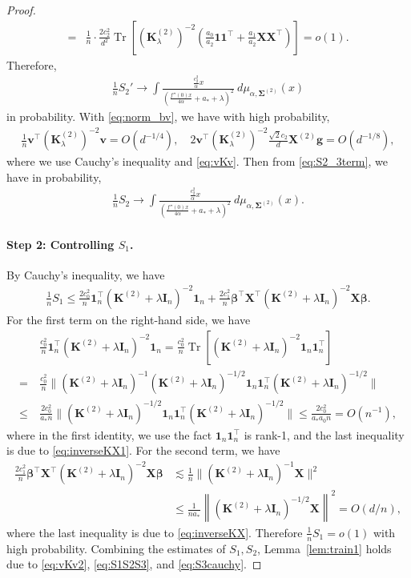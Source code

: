 \documentclass[twoside,11pt]{article}
\def\bI{{\mathbf I}}
\def\bK{{\boldsymbol K}}
\def\bX{{\boldsymbol X}}
\def\bg{{\boldsymbol g}}
\def\bv{{\boldsymbol v}}
\def\bbeta{{\boldsymbol \beta}}
\def\bSigma{{\boldsymbol \Sigma}}
\renewcommand{\bK}{\boldsymbol{K}}
\newcommand{\Tr}{\operatorname{Tr}}
\newcommand{\1}{\mathbf{1}}
\begin{document}
\begin{proof}
\begin{align}
=&\frac{1}{n}\cdot\frac{2c_2^2}{d^2}\Tr\left[(\bK^{(2)}_{\lambda})^{-2}\left(\frac{a_0}{a_2} \1\1^\top +\frac{a_1}{a_2}\bX\bX^\top \right)\right]=o(1).
\end{align}
Therefore, 
\begin{align}\label{eq:vKv}
     \frac{1}{n} S_2'\to \int \frac{\frac{c_2^2}{\alpha} x}{\left( \frac{f''(0)x}{4\alpha}+a_*+\lambda \right)^2}~d\mu_{\alpha,\bSigma^{(2)}}(x)
\end{align}
 in probability. With \eqref{eq:norm_bv}, we have with high probability,
\begin{align}
   \frac{1}{n} \bv^\top\left( \bK_{\lambda}^{(2)}\right)^{-2}\bv=O(d^{-1/4}), \quad 
2\bv^\top\left( \bK_{\lambda}^{(2)}\right)^{-2}\frac{\sqrt 2 c_2}{d}\bX^{(2)}\bg=O(d^{-1/8}),   
\end{align}
where we use Cauchy's inequality and \eqref{eq:vKv}. Then from \eqref{eq:S2_3term}, we have in probability,
\begin{align}\label{eq:vKv2}
     \frac{1}{n} S_2\to \int \frac{\frac{c_2^2}{\alpha} x}{\left( \frac{f''(0)x}{4\alpha}+a_*+\lambda \right)^2}~d\mu_{\alpha,\bSigma^{(2)}}(x).
\end{align}
          


\paragraph{Step 2: Controlling $S_1$.} By Cauchy's inequality, we have
\begin{align}
    \frac{1}{n} S_1\leq \frac{2 c_0^2}{n} \1_n^\top (\bK^{(2)} +\lambda\bI_n)^{-2}\1_n + \frac{2c_1^2}{n}\bbeta^\top \bX^\top (\bK^{(2)} +\lambda\bI_n)^{-2} \bX \bbeta.
\end{align}
For the first term on the right-hand side, we have
\begin{align}
   &\frac{c_0^2}{n}\1_n^\top (\bK^{(2)} +\lambda\bI_n)^{-2}\1_n=\frac{c_0^2}{n} \Tr[(\bK^{(2)} +\lambda\bI_n)^{-2}\1_n\1_n^\top]\\
   =~&\frac{c_0^2}{n} \| (\bK^{(2)} +\lambda\bI_n)^{-1}(\bK^{(2)} +\lambda\bI_n)^{-1/2}\1_n\1_n^\top(\bK^{(2)} +\lambda\bI_n)^{-1/2}\|\\
    \leq~ &\frac{2c_0^2}{a_*n}\| (\bK^{(2)} +\lambda\bI_n)^{-1/2}\1_n\1_n^\top(\bK^{(2)} +\lambda\bI_n)^{-1/2}\|\leq \frac{2c_0^2}{a_*a_0n}=O(n^{-1}),
\end{align}
where in the first identity, we use the fact $\1_n\1_n^\top$ is rank-1, and the last inequality is due to \eqref{eq:inverseKX1}. For the second term, we have 
\begin{align}
    \frac{2c_1^2}{n}\bbeta^\top \bX^\top (\bK^{(2)} +\lambda\bI_n)^{-2} \bX \bbeta &\lesssim \frac{1}{n} \|  (\bK^{(2)} +\lambda\bI_n)^{-1} \bX \|^2\\
    &\leq \frac{1}{na_*} \left\| (\bK^{(2)} +\lambda\bI_n)^{-1/2}\bX\right\|^2=O(d/n),
\end{align}
where the last inequality is due to \eqref{eq:inverseKX}. Therefore $\frac{1}{n}{S_1}=o(1)$ with high probability. Combining the estimates of $S_1, S_2$, Lemma~\ref{lem:train1} holds due to \eqref{eq:vKv2}, \eqref{eq:S1S2S3}, and \eqref{eq:S3cauchy}.
\end{proof}
\end{document}
